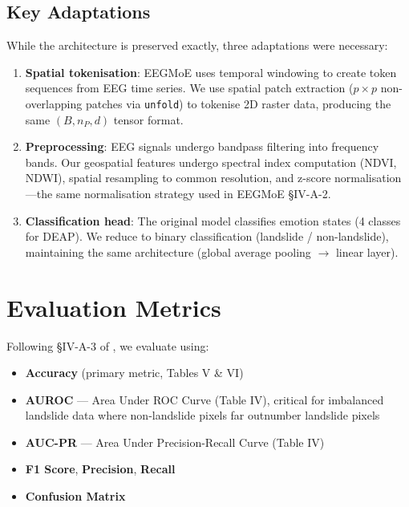 \documentclass[conference]{IEEEtran}
\begin{document}
\subsection{Key Adaptations}

While the architecture is preserved exactly, three adaptations were necessary:

\begin{enumerate}
    \item \textbf{Spatial tokenisation}: EEGMoE uses temporal windowing to create token sequences from EEG time series. We use spatial patch extraction ($p \times p$ non-overlapping patches via \texttt{unfold}) to tokenise 2D raster data, producing the same $(B, n_P, d)$ tensor format.
    
    \item \textbf{Preprocessing}: EEG signals undergo bandpass filtering into frequency bands. Our geospatial features undergo spectral index computation (NDVI, NDWI), spatial resampling to common resolution, and z-score normalisation—the same normalisation strategy used in EEGMoE \S IV-A-2.
    
    \item \textbf{Classification head}: The original model classifies emotion states (4 classes for DEAP). We reduce to binary classification (landslide / non-landslide), maintaining the same architecture (global average pooling $\rightarrow$ linear layer).
\end{enumerate}

\section{Evaluation Metrics}

Following \S IV-A-3 of \cite{eegmoe2026}, we evaluate using:

\begin{itemize}
    \item \textbf{Accuracy} (primary metric, Tables V \& VI)
    \item \textbf{AUROC} — Area Under ROC Curve (Table IV), critical for imbalanced landslide data where non-landslide pixels far outnumber landslide pixels
    \item \textbf{AUC-PR} — Area Under Precision-Recall Curve (Table IV)
    \item \textbf{F1 Score}, \textbf{Precision}, \textbf{Recall}
    \item \textbf{Confusion Matrix}
\end{itemize}
\end{document}

